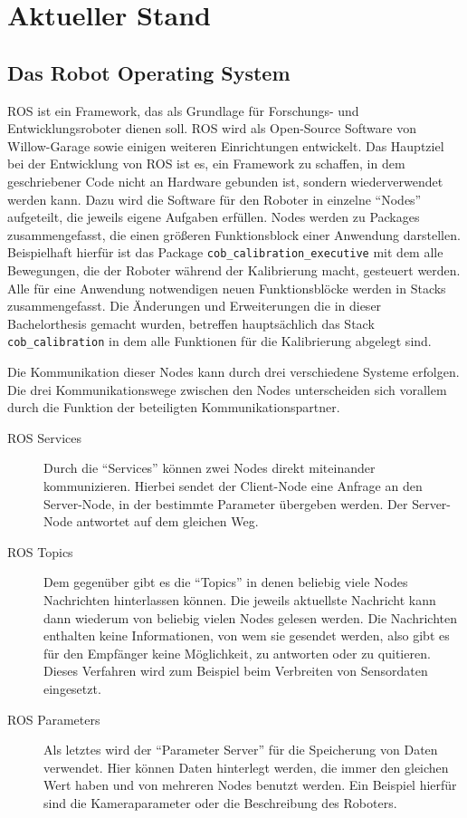 \chapter{Aktueller Stand} \section{Das Robot Operating System}

\ac{ROS} ist ein Framework, das als Grundlage für Forschungs- und
Entwicklungsroboter dienen soll. \ac{ROS} wird als Open-Source Software von
Willow-Garage sowie einigen weiteren Einrichtungen entwickelt. Das Hauptziel bei
der Entwicklung von \ac{ROS} ist es, ein Framework zu schaffen, in dem
geschriebener Code nicht an Hardware gebunden ist, sondern wiederverwendet
werden kann. Dazu wird die Software für den Roboter in einzelne ``Nodes''
aufgeteilt, die jeweils eigene Aufgaben erfüllen. Nodes werden zu Packages
zusammengefasst, die einen größeren Funktionsblock einer Anwendung darstellen.
Beispielhaft hierfür ist das Package \texttt{cob\_calibration\_executive} mit
dem alle Bewegungen, die der Roboter während der Kalibrierung macht, gesteuert
werden. Alle für eine Anwendung notwendigen neuen Funktionsblöcke werden in
Stacks zusammengefasst. Die Änderungen und Erweiterungen die in dieser
Bachelorthesis gemacht wurden, betreffen hauptsächlich das Stack
\texttt{cob\_calibration} in dem alle Funktionen für die Kalibrierung abgelegt
sind. 

Die Kommunikation dieser Nodes kann durch drei verschiedene Systeme erfolgen.
Die drei Kommunikationswege zwischen den Nodes unterscheiden sich vorallem
durch die Funktion der beteiligten Kommunikationspartner. 

\begin{description}

  \item[\ac{ROS} Services] Durch die ``Services'' können zwei Nodes direkt
    miteinander kommunizieren. Hierbei sendet der Client-Node eine Anfrage an
    den Server-Node, in der bestimmte Parameter übergeben werden. Der
    Server-Node antwortet auf dem gleichen Weg.


  \item[\ac{ROS} Topics]Dem gegenüber gibt es die ``Topics'' in denen beliebig
    viele Nodes Nachrichten hinterlassen können. Die jeweils aktuellste
    Nachricht kann dann wiederum von beliebig vielen Nodes gelesen werden. Die
    Nachrichten enthalten keine Informationen, von wem sie gesendet werden, also
    gibt es für den Empfänger keine Möglichkeit, zu antworten oder zu quitieren.
    Dieses Verfahren wird zum Beispiel beim Verbreiten von Sensordaten
    eingesetzt.


  \item[\ac{ROS} Parameters]Als letztes wird der ``Parameter Server'' für die
    Speicherung von Daten verwendet. Hier können Daten hinterlegt werden, die
    immer den gleichen Wert haben und von mehreren Nodes benutzt werden. Ein
    Beispiel hierfür sind die Kameraparameter oder die Beschreibung des
    Roboters. 

\end{description}

